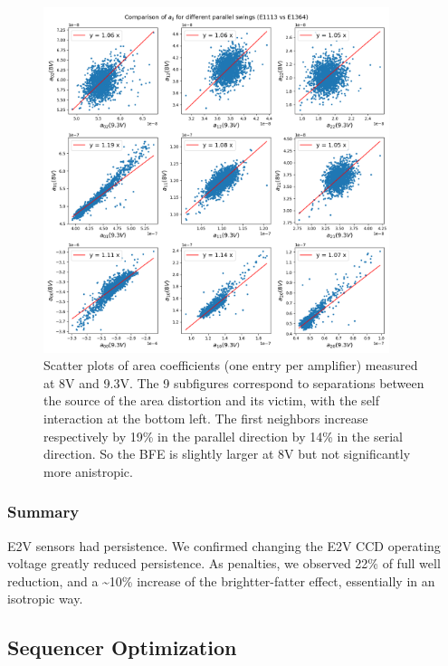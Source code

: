 \begin{figure}
\begin{centering}
\includegraphics[width=0.9\textwidth]{sections/figures/aScatterPlots8vs9.3.png}
\end{centering}
\caption{Scatter plots of area coefficients (one entry per amplifier)
measured at 8V and 9.3V. The 9 subfigures correspond to separations
between the source of the area distortion and its victim, with the self
interaction at the bottom left. The first neighbors increase
respectively by 19\% in the parallel direction by 14\% in the serial
direction. So the BFE is slightly larger at 8V but not significantly
more anistropic.}
\end{figure}

\subsubsection{Summary}\label{summary}

E2V sensors had persistence. We confirmed changing the E2V CCD operating
voltage greatly reduced persistence. As penalties, we observed 22\% of
full well reduction, and a \textasciitilde10\% increase of the
brightter-fatter effect, essentially in an isotropic way.

\subsection{Sequencer Optimization}\label{sequencer-optimization}


